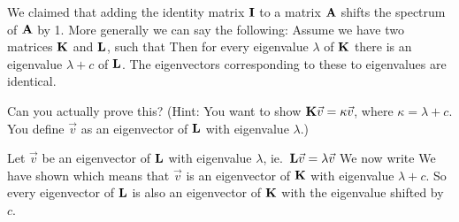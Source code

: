 
We claimed that adding the identity matrix $\bf I$ to a matrix $\bf A$ shifts the spectrum of $\bf A$ by 1. 
More generally we can say the following: Assume we have two matrices  $\bf K$ and ${\bf L}$, such that 
Then for every eigenvalue $\lambda$ of $\bf K$ there is an eigenvalue $\lambda+c$ of $\bf L$. The eigenvectors corresponding to these to eigenvalues are identical. 

Can you actually prove this?
(Hint: You want to show ${\bf K}\vec{v}=\kappa \vec{v}$, where $\kappa=\lambda+c$. You define $\vec{v}$ as an eigenvector of $\bf L$ with eigenvalue $\lambda$.)

\solution
Let $\vec{v}$ be an eigenvector of $\bf L$ with eigenvalue $\lambda$, ie.~${\bf L}\vec{v}=\lambda \vec{v}$ 
We now write 
We have shown 
which means that $\vec{v}$ is an eigenvector of $\bf K$ with eigenvalue $\lambda+c$. So every eigenvector of $\bf L$ is also an eigenvector of $\bf K$ with the eigenvalue shifted by $c$.


